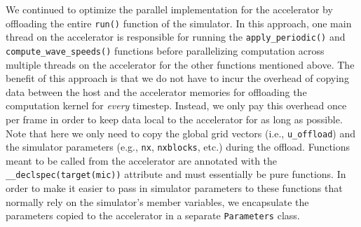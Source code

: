 We continued to optimize the parallel implementation for the accelerator
by offloading the entire \texttt{run()} function of the simulator. In
this approach, one main thread on the accelerator is responsible for
running the \texttt{apply\_periodic()} and \texttt{compute\_wave\_speeds()}
functions before parallelizing computation across multiple threads on the
accelerator for the other functions mentioned above. The benefit of this
approach is that we do not have to incur the overhead of copying data
between the host and the accelerator memories for offloading the
computation kernel for \emph{every} timestep. Instead, we only pay this
overhead once per frame in order to keep data local to the accelerator
for as long as possible. Note that here we only need to copy the global
grid vectors (i.e., \texttt{u\_offload}) and the simulator parameters
(e.g., \texttt{nx}, \texttt{nxblocks}, etc.) during the
offload. Functions meant to be called from the accelerator are annotated
with the \texttt{\_\_declspec(target(mic))} attribute and must
essentially be pure functions. In order to make it easier to pass in
simulator parameters to these functions that normally rely on the
simulator's member variables, we encapsulate the parameters copied to the
accelerator in a separate \texttt{Parameters} class.
